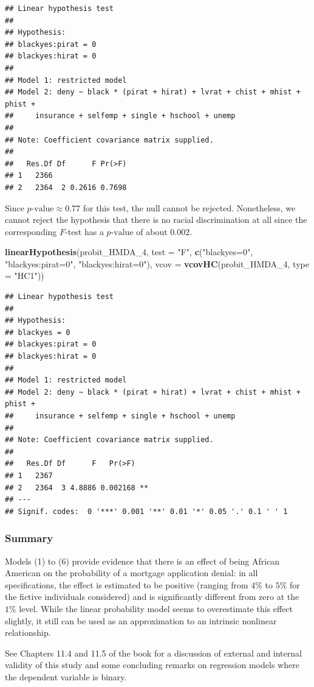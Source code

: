 \documentclass[]{book}
\newenvironment{Shaded}{\begin{snugshade}}{\end{snugshade}}
\newcommand{\KeywordTok}[1]{\textcolor[rgb]{0.13,0.29,0.53}{\textbf{#1}}}
\newcommand{\DataTypeTok}[1]{\textcolor[rgb]{0.13,0.29,0.53}{#1}}
\newcommand{\DecValTok}[1]{\textcolor[rgb]{0.00,0.00,0.81}{#1}}
\newcommand{\StringTok}[1]{\textcolor[rgb]{0.31,0.60,0.02}{#1}}
\newcommand{\NormalTok}[1]{#1}
\theoremstyle{definition}
\theoremstyle{definition}
\theoremstyle{definition}
\theoremstyle{remark}
\begin{document}
\begin{verbatim}
## Linear hypothesis test
## 
## Hypothesis:
## blackyes:pirat = 0
## blackyes:hirat = 0
## 
## Model 1: restricted model
## Model 2: deny ~ black * (pirat + hirat) + lvrat + chist + mhist + phist + 
##     insurance + selfemp + single + hschool + unemp
## 
## Note: Coefficient covariance matrix supplied.
## 
##   Res.Df Df      F Pr(>F)
## 1   2366                 
## 2   2364  2 0.2616 0.7698
\end{verbatim}

Since \(p\text{-value} \approx 0.77\) for this test, the null cannot be
rejected. Nonetheless, we cannot reject the hypothesis that there is no
racial discrimination at all since the corresponding \(F\)-test has a
\(p\text{-value}\) of about \(0.002\).

\begin{Shaded}
\begin{Highlighting}[]
\KeywordTok{linearHypothesis}\NormalTok{(probit_HMDA_}\DecValTok{4}\NormalTok{,}
                 \DataTypeTok{test =} \StringTok{"F"}\NormalTok{,}
                 \KeywordTok{c}\NormalTok{(}\StringTok{"blackyes=0"}\NormalTok{, }\StringTok{"blackyes:pirat=0"}\NormalTok{, }\StringTok{"blackyes:hirat=0"}\NormalTok{),}
                 \DataTypeTok{vcov =} \KeywordTok{vcovHC}\NormalTok{(probit_HMDA_}\DecValTok{4}\NormalTok{, }\DataTypeTok{type =} \StringTok{"HC1"}\NormalTok{))}
\end{Highlighting}
\end{Shaded}

\begin{verbatim}
## Linear hypothesis test
## 
## Hypothesis:
## blackyes = 0
## blackyes:pirat = 0
## blackyes:hirat = 0
## 
## Model 1: restricted model
## Model 2: deny ~ black * (pirat + hirat) + lvrat + chist + mhist + phist + 
##     insurance + selfemp + single + hschool + unemp
## 
## Note: Coefficient covariance matrix supplied.
## 
##   Res.Df Df      F   Pr(>F)   
## 1   2367                      
## 2   2364  3 4.8886 0.002168 **
## ---
## Signif. codes:  0 '***' 0.001 '**' 0.01 '*' 0.05 '.' 0.1 ' ' 1
\end{verbatim}

\subsubsection*{Summary}\label{summary}

Models (1) to (6) provide evidence that there is an effect of being
African American on the probability of a mortgage application denial: in
all specifications, the effect is estimated to be positive (ranging from
\(4\%\) to \(5\%\) for the fictive individuals considered) and is
significantly different from zero at the \(1\%\) level. While the linear
probability model seems to overestimate this effect slightly, it still
can be used as an approximation to an intrinsic nonlinear relationship.

See Chapters 11.4 and 11.5 of the book for a discussion of external and
internal validity of this study and some concluding remarks on
regression models where the dependent variable is binary.


\end{document}

